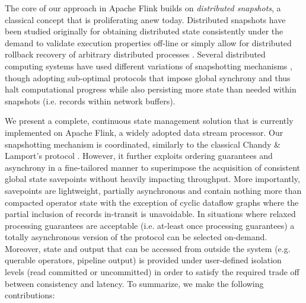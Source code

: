 
The core of our approach in Apache Flink builds on \emph{distributed snapshots}, a  classical concept that is proliferating anew today. Distributed snapshots have been studied originally for obtaining distributed state consistently under the demand to validate execution properties off-line or simply allow for distributed rollback recovery of arbitrary distributed processes \cite{elnozahy2002survey}. Several distributed computing systems have used different variations of snapshotting mechanisms \cite{murray2013naiad,low2012distributed}, though adopting sub-optimal protocols that impose global synchrony and thus halt computational progress while also persisting more state than needed within snapshots (i.e. records within network buffers).


We present a complete, continuous state management solution that is currently implemented on Apache Flink, a widely adopted data stream processor. Our snapshotting mechanism is coordinated, similarly to the classical Chandy \& Lamport's protocol \cite{chandy1985distributed}. However, it further exploits ordering guarantees and asynchrony in a fine-tailored manner to superimpose the acquisition of consistent global state savepoints without heavily impacting throughput. More importantly, savepoints are lightweight, partially asynchronous and contain nothing more than compacted operator state with the exception of cyclic dataflow graphs where the partial inclusion of records in-transit is unavoidable. In situations where relaxed processing guarantees are acceptable (i.e. at-least once processing guarantees) a totally asynchronous version of the protocol can be selected on-demand. Moreover, state and output that can be accessed from outside the system (e.g. querable operators, pipeline output) is provided under user-defined isolation levels (read committed or uncommitted) in order to satisfy the required trade off between consistency and latency. To summarize, we make the following contributions: 

